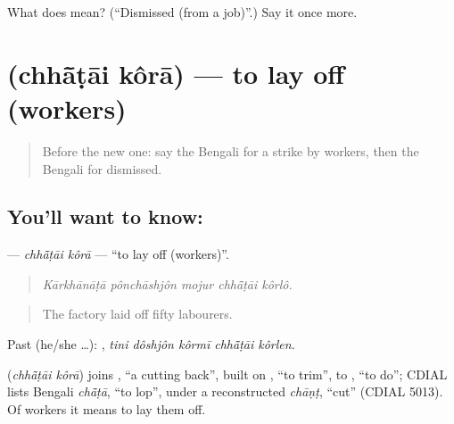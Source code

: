 \begin{tcolorbox}[breakable,colback=teal!4,colframe=teal!35!black,title={Before you move on}]
What does  mean? (\textquotedblleft{}Dismissed (from a job)\textquotedblright{}.) Say it once more.
\end{tcolorbox}
\section[\texorpdfstring{\bn{ছাঁটাই} \bn{করা} (chhā̃ṭāi kôrā)}{ছাঁটাই করা (chhā̃ṭāi kôrā)}]{  (chhā̃ṭāi kôrā) — to lay off (workers)}

\label{lesson:BN-C497-chhatai-kora}



\begin{quote}
Before the new one: say the Bengali for a strike by workers, then the Bengali for dismissed.
\end{quote}

\subsection*{You'll want to know:  }
\textbf{ } — \emph{chhā̃ṭāi kôrā} — \textquotedblleft{}to lay off (workers)\textquotedblright{}.

\begin{quote}
    
\end{quote}

\begin{quote}
\emph{Kārkhānāṭā pônchāshjôn mojur chhā̃ṭāi kôrlô.}
\end{quote}

\begin{quote}
The factory laid off fifty labourers.
\end{quote}

Past (he/she …):     , \emph{tini dôshjôn kôrmī chhā̃ṭāi kôrlen}.

\begin{cousinweb}
\textbf{ } (\emph{chhā̃ṭāi kôrā}) joins , \textquotedblleft{}a cutting back\textquotedblright{}, built on , \textquotedblleft{}to trim\textquotedblright{}, to , \textquotedblleft{}to do\textquotedblright{}; CDIAL lists Bengali \emph{chā̃ṭā}, \textquotedblleft{}to lop\textquotedblright{}, under a reconstructed \emph{chāṇṭ}, \textquotedblleft{}cut\textquotedblright{} (CDIAL 5013). Of workers it means to lay them off.
\end{cousinweb}

